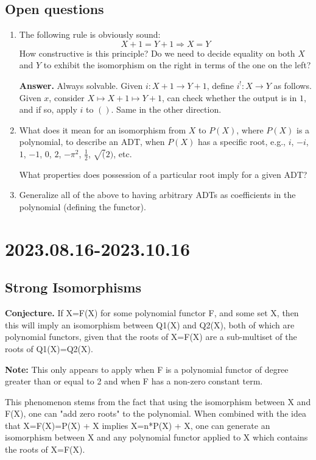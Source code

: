 \documentclass[letterpaper,numbers=enddot]{scrartcl}
\newcommand{\then}{\mathbin{\Longrightarrow}}
\begin{document}
\subsection{Open questions}

\begin{enumerate}
  \item The following rule is obviously sound:
  \[ X+1 = Y+1 \then X=Y \]
  How constructive is this principle?
  Do we need to decide equality on both $X$ and $Y$ to exhibit the
  isomorphism on the right in terms of the one on the left?

  \textbf{Answer.}
  Always solvable.  Given $i : X+1 \to Y+1$, define $i^! :X \to Y$ as follows.
  Given $x$, consider $X \mapsto X+1 \mapsto Y+1$, can check whether the output is in $1$, and if so,
  apply $i$ to $()$.  Same in the other direction.

  \item What does it mean for an isomorphism from $X$ to $P(X)$, where $P(X)$
  is a polynomial, to describe an ADT, when $P(X)$ has a specific root,
  e.g., $i$, $-i$, $1$, $-1$, $0$, $2$, $-\pi^2$, $\frac{1}{2}$, $\sqrt(2)$, etc.

  What properties does possession of a particular root imply for a given ADT?

  \item Generalize all of the above to having arbitrary ADTs as coefficients
  in the polynomial (defining the functor).

\end{enumerate}

\section{2023.08.16-2023.10.16}

\subsection{Strong Isomorphisms}

\textbf{Conjecture.}
If X=F(X) for some polynomial functor F, and some set
 X, then this will imply an isomorphism between Q1(X) and Q2(X), both of
 which are polynomial functors, given that the roots of X=F(X) are a
 sub-multiset of the roots of Q1(X)=Q2(X).

\textbf{Note: }
 This only appears to apply when F is a polynomial functor of degree
 greater than or equal to 2 and when F has a non-zero constant term.

 This phenomenon stems from the fact that using the isomorphism between
  X and F(X), one can "add zero roots" to the polynomial.  When combined with the idea that X=F(X)=P(X) + X implies X=n*P(X) + X,
  one can generate an isomorphism between X and any polynomial functor applied to X which contains the roots of X=F(X).
\end{document}
